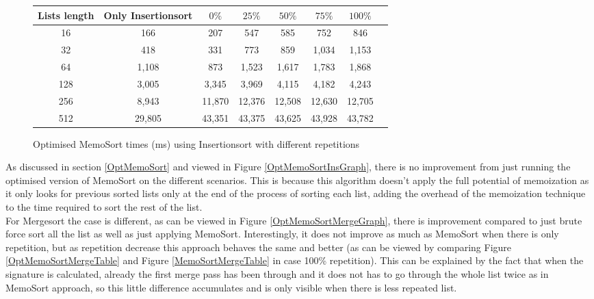 \documentclass[a4paper,12pt]{article}
\begin{document}
\begin{figure}[H]
\centering
\begin{tabular}{|c|c|c|c|c|c|c|c|}  \toprule
	{Lists length} & {Only Insertionsort} & {$0\%$} & {$25\%$} & {$50\%$} & {$75\%$} & {$100\%$} \\ \midrule
	16 &166&207&547 & 585 & 752 & 846\\ 
	32 &418&331&773 & 859& 1,034& 1,153\\ 
	64 &1,108&873 &1,523&1,617&1,783& 1,868\\ 
	128 &3,005&3,345&3,969&4,115&4,182 &4,243\\ 
	256 &8,943&11,870&12,376 &12,508&12,630&12,705\\ 
	512 &29,805 & 43,351&43,375 &43,625 &43,928 &43,782\\ \bottomrule
\end{tabular}
\caption{Optimised MemoSort times (ms) using Insertionsort with different repetitions}
\label{ref:OptMemoSortInsTable}
\end{figure}


As discussed in section \ref{OptMemoSort} and viewed in Figure \ref{OptMemoSortInsGraph}, there is no improvement from just running the optimised version of MemoSort on the different scenarios. This is because this algorithm doesn't apply the full potential of memoization as it only looks for previous sorted lists only at the end of the process of sorting each list, adding the overhead of the memoization technique to the time required to sort the rest of the list. \\

For Mergesort the case is different, as can be viewed in Figure \ref{OptMemoSortMergeGraph}, there is improvement compared to just brute force sort all the list as well as just applying MemoSort. Interestingly, it does not improve as much as MemoSort when there is only repetition, but as repetition decrease this approach behaves the same and better (as can be viewed by comparing Figure \ref{OptMemoSortMergeTable} and Figure \ref{MemoSortMergeTable} in case 100\% repetition). This can be explained by the fact that when the signature is calculated, already the first merge pass has been through and it does not has to go through the whole list twice as in MemoSort approach, so this little difference accumulates and is only visible when there is less repeated list.
\end{document}
